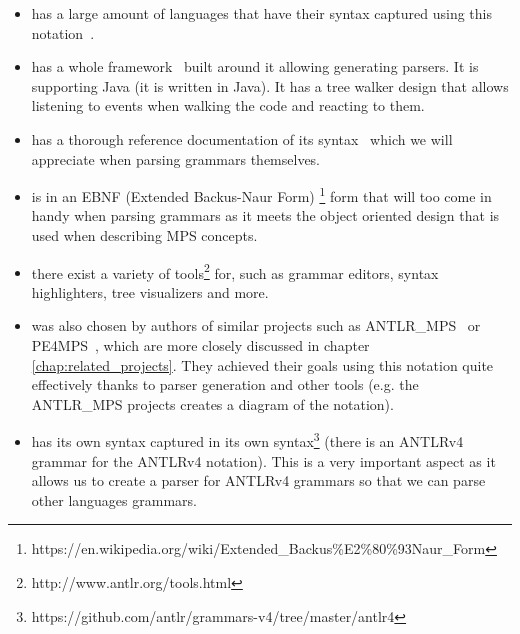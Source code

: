\begin{itemize}
	\item has a large amount of languages that have their syntax captured using this notation~\cite{ANTLR4grammars}.

	\item has a whole framework~\cite{ANTLR4} built around it allowing generating parsers.
	It is supporting Java (it is written in Java).
	It has a tree walker design that allows listening to events when walking the code and reacting to them.

	\item has a thorough reference documentation of its syntax~\cite{ANTLR4reference} which we will appreciate when parsing grammars themselves.

	\item is in an EBNF (Extended Backus-Naur Form) \footnote{https://en.wikipedia.org/wiki/Extended{\_}Backus\%E2\%80\%93Naur{\_}Form} form that will too come in handy when parsing grammars as it meets the object oriented design that is used when describing MPS concepts.

	\item there exist a variety of tools\footnote{http://www.antlr.org/tools.html} for, such as grammar editors, syntax highlighters, tree visualizers and more.

	\item was also chosen by authors of similar projects such as ANTLR{\_}MPS~\cite{ANTLR2MPS} or PE4MPS~\cite{PE4MPS}, which are more closely discussed in chapter \ref{chap:related_projects}.
	They achieved their goals using this notation quite effectively thanks to parser generation and other tools (e.g. the ANTLR{\_}MPS projects creates a diagram of the notation).

	\item has its own syntax captured in its own syntax\footnote{https://github.com/antlr/grammars-v4/tree/master/antlr4} (there is an ANTLRv4 grammar for the ANTLRv4 notation).
	This is a very important aspect as it allows us to create a parser for ANTLRv4 grammars so that we can parse other languages grammars.
\end{itemize}
